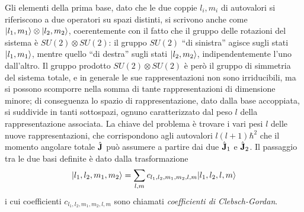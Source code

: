 Gli elementi della prima base, dato che le due coppie $l_i,m_i$ di autovalori si riferiscono a due operatori su spazi distinti, si scrivono anche come $\lvert l_1,m_1\rangle\otimes\lvert l_2,m_2\rangle$, coerentemente con il fatto che il gruppo delle rotazioni del sistema è $SU(2)\otimes SU(2)$: il gruppo $SU(2)$ ``di sinistra'' agisce sugli stati $\lvert l_1,m_1\rangle$, mentre quello ``di destra'' sugli stati $\lvert l_2,m_2\rangle$, indipendentemente l'uno dall'altro.
Il gruppo prodotto $SU(2)\otimes SU(2)$ è però il gruppo di simmetria del sistema totale, e in generale le sue rappresentazioni non sono irriducibili, ma si possono scomporre nella somma di tante rappresentazioni di dimensione minore; di conseguenza lo spazio di rappresentazione, dato dalla base accoppiata, si suddivide in tanti sottospazi, ognuno caratterizzato dal peso $l$ della rappresentazione associata.
La chiave del problema è trovare i vari pesi $l$ delle nuove rappresentazioni, che corrispondono agli autovalori $l(l+1)\hbar^2$ che il momento angolare totale $\hat{\mathbf{J}}$ può assumere a partire dai due $\hat{\mathbf{J}}_1$ e $\hat{\mathbf{J}}_2$.
Il passaggio tra le due basi definite è dato dalla trasformazione
\begin{equation}
	\lvert l_1,l_2,m_1,m_2\rangle=\sum_{l,m}c_{l_1,l_2,m_1,m_2,l,m}\lvert l_1,l_2,l,m\rangle
	\label{eq:clebsh-gordan}
\end{equation}
i cui coefficienti $c_{l_1,l_2,m_1,m_2,l,m}$ sono chiamati \emph{coefficienti di Clebsch-Gordan}.

